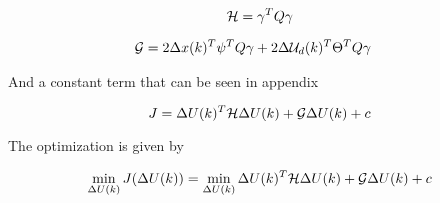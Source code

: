 \begin{equation}
	\CMcal{H} = \gamma^T Q\gamma 
\end{equation}

\begin{equation}
	\begin{aligned}
	\CMcal{G} &= 2 \Delta x(k)^T\psi^T Q \gamma+2 \Delta \CMcal{U}_d(k)^T\Theta^T Q \gamma 
	\end{aligned}
\end{equation}

And a constant term that can be seen in appendix

\begin{equation}
	J = \Delta U(k)^T\CMcal{H}\Delta U(k)+ \CMcal{G}\Delta U(k)+ c
\end{equation}

The optimization is given by

\begin{equation}
	\min_{\Delta U(k)} J(\Delta U(k)) =\min_{\Delta U(k)} \Delta U(k)^T\CMcal{H}\Delta U(k)+\CMcal{G}\Delta U(k)+c
\end{equation}